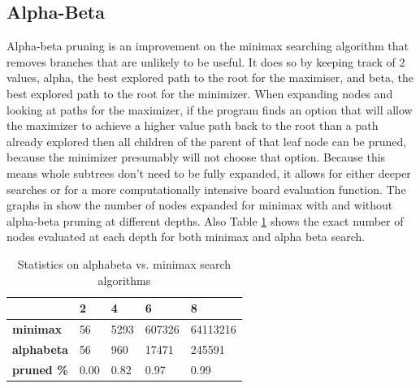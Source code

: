 \documentclass{article}
\begin{document}
\subsection{Alpha-Beta}

Alpha-beta pruning is an improvement on the minimax searching algorithm that
removes branches that are unlikely to be useful. It does so by keeping track of
2 values, alpha, the best explored path to the root for the maximiser, and
beta, the best explored path to the root for the minimizer. When expanding
nodes and looking at paths for the maximizer, if the program finds an option
that will allow the maximizer to achieve a higher value path back to the root
than a path already explored then all children of the parent of that leaf node
can be pruned, because the minimizer presumably will not choose that option.
Because this means whole subtrees don’t need to be fully expanded, it allows
for either deeper searches  or for a more computationally intensive board
evaluation function. The graphs in  show the number of nodes expanded for
minimax with and without alpha-beta pruning at different depths. Also Table \ref{ab-v-mm}
shows the exact number of nodes evaluated at each depth for both minimax and alpha beta
search.

\begin{table}[]
\centering
\caption{Statistics on alphabeta vs. minimax search algorithms}
\label{ab-v-mm}
\begin{tabular}{|l|l|l|l|l|}
\hline
& \textbf{2}    & \textbf{4}   & \textbf{6}      & \textbf{8}        \\ \hline
\textbf{minimax}   & 56   & 5293 & 607326 & 64113216 \\ \hline
\textbf{alphabeta} & 56   & 960  & 17471  & 245591   \\ \hline
\textbf{pruned \%} & 0.00 & 0.82 & 0.97   & 0.99     \\ \hline
\end{tabular}
\end{table}
\end{document}
